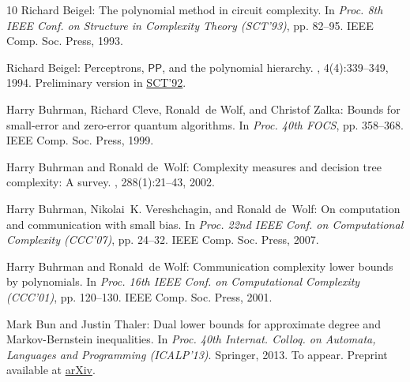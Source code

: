 \begin{thebibliography}{10}
{\sc Richard Beigel}: The polynomial method in circuit complexity.
\newblock In {\em Proc. 8th IEEE Conf. on Structure in Complexity Theory
  (SCT'93)}, pp. 82--95. IEEE Comp. Soc. Press, 1993.

{\sc Richard Beigel}: Perceptrons, {$\mathsf{PP}$}, and the polynomial
  hierarchy.
, 4(4):339--349, 1994.
\newblock Preliminary version in
  \href{http://dx.doi.org/10.1109/SCT.1992.215376}{SCT'92}.
\newblock [\epfmtdoi{10.1007/BF01263422}]

{\sc Harry Buhrman, Richard Cleve, Ronald~de Wolf, and Christof Zalka}: Bounds
  for small-error and zero-error quantum algorithms.
\newblock In {\em Proc. 40th FOCS}, pp. 358--368. IEEE Comp. Soc. Press, 1999.

{\sc Harry Buhrman and Ronald de~Wolf}: Complexity measures and decision tree
  complexity: {A} survey.
, 288(1):21--43, 2002.
\newblock [\epfmtdoi{10.1016/S0304-3975(01)00144-X}]

{\sc Harry Buhrman, Nikolai~K. Vereshchagin, and Ronald de~Wolf}: On
  computation and communication with small bias.
\newblock In {\em Proc. 22nd IEEE Conf. on Computational Complexity (CCC'07)},
  pp. 24--32. IEEE Comp. Soc. Press, 2007.

{\sc Harry Buhrman and Ronald~de Wolf}: Communication complexity lower bounds
  by polynomials.
\newblock In {\em Proc. 16th IEEE Conf. on Computational Complexity (CCC'01)},
  pp. 120--130. IEEE Comp. Soc. Press, 2001.

{\sc Mark Bun and Justin Thaler}: Dual lower bounds for approximate degree and
  {M}arkov-{B}ernstein inequalities.
\newblock In {\em Proc. 40th Internat. Colloq. on Automata, Languages and
  Programming (ICALP'13)}. Springer, 2013.
\newblock To appear. Preprint available at
  \href{http://arxiv.org/abs/1302.6191}{arXiv}.


\end{thebibliography}
